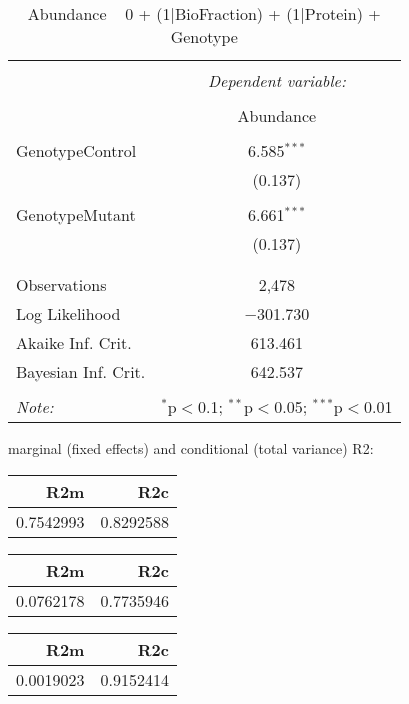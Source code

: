 \documentclass[11pt]{report}
\begin{document}
\begin{table}[!htbp] \centering 
  \caption{Abundance ~ 0 + (1|BioFraction) + (1|Protein) + Genotype} 
  \label{} 
\begin{tabular}{@{\extracolsep{5pt}}lc} 
\\[-1.8ex]\hline 
\hline \\[-1.8ex] 
 & \multicolumn{1}{c}{\textit{Dependent variable:}} \\ 
\cline{2-2} 
\\[-1.8ex] & Abundance \\ 
\hline \\[-1.8ex] 
 GenotypeControl & 6.585$^{***}$ \\ 
  & (0.137) \\ 
  & \\ 
 GenotypeMutant & 6.661$^{***}$ \\ 
  & (0.137) \\ 
  & \\ 
\hline \\[-1.8ex] 
Observations & 2,478 \\ 
Log Likelihood & $-$301.730 \\ 
Akaike Inf. Crit. & 613.461 \\ 
Bayesian Inf. Crit. & 642.537 \\ 
\hline 
\hline \\[-1.8ex] 
\textit{Note:}  & \multicolumn{1}{r}{$^{*}$p$<$0.1; $^{**}$p$<$0.05; $^{***}$p$<$0.01} \\ 
\end{tabular} 
\end{table} 
marginal (fixed effects) and conditional (total variance) R2:

\begin{tabular}{r|r}
\hline
R2m & R2c\\
\hline
0.7542993 & 0.8292588\\
\hline
\end{tabular}

\begin{tabular}{r|r}
\hline
R2m & R2c\\
\hline
0.0762178 & 0.7735946\\
\hline
\end{tabular}

\begin{tabular}{r|r}
\hline
R2m & R2c\\
\hline
0.0019023 & 0.9152414\\
\hline
\end{tabular}
\end{document}

